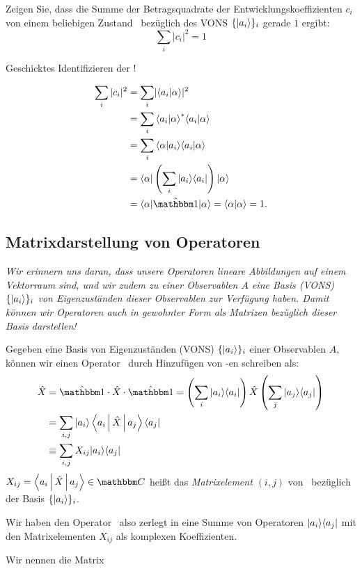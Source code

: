 \begin{aufg}
 Zeigen Sie, dass die Summe der Betragsquadrate der Entwicklungskoeffizienten $c_i$ von einem beliebigen Zustand \keta\ bez\"uglich des VONS $\{\ket{a_i}\}_i$ gerade $1$ ergibt:
 \begin{equation}
  \sum_i |c_i|^2 = 1
 \end{equation}
\end{aufg}
\begin{tipp}
 Geschicktes Identifizieren der \opi!
\end{tipp}
\begin{loes}
 \begin{align}
  \sum_i |c_i|^2 &= \sum_i \lvert\braket{a_i|\alpha}\rvert^2 \\
  &= \sum_i \cc{\braket{a_i | \alpha}} \braket{a_i|\alpha} \\
  &= \sum_i \braket{\alpha | a_i} \braket{a_i|\alpha} \\
  &= \braa \left(\sum_i \ket{a_i}\bra{a_i} \right) \keta \\
  &= \braa \opi \keta = \braket{\alpha | \alpha} = 1.
 \end{align}
 \qedsymbol
\end{loes}


\subsection{Matrixdarstellung von Operatoren}
\emph{Wir erinnern uns daran, dass unsere Operatoren lineare Abbildungen auf einem Vektorraum sind, und wir zudem zu einer Observablen $A$ eine Basis (VONS) $\{\ket{a_i}\}_i$ von Eigenzust\"anden dieser Observablen zur Verf\"ugung haben. Damit k\"onnen wir Operatoren auch in gewohnter Form als Matrizen bez\"uglich dieser Basis darstellen!}
\begin{defn}
 Gegeben eine Basis von Eigenzust\"anden (VONS)  $\{\ket{a_i}\}_i$ einer Observablen $A$, k\"onnen wir einen Operator \opx\ durch Hinzuf\"ugen von \opi-en schreiben als:
 \begin{align}
  \opx &= \opi \cdot  \opx \cdot \opi = \left(\opix{i}{a_i} \right) \opx \left(\opix{j}{a_j}\right) \\
  &= \sum_{i,j} \ket{a_i} \Braket{a_i | \opx | a_j} \bra{a_j} \\
  &\equiv \sum_{i,j} X_{ij} \ket{a_i}\bra{a_j}
 \end{align}
 $X_{ij} = \Braket{a_i | \opx | a_j} \in \comps$ hei\ss{}t das \emph{Matrixelement $(i,j)$} von \opx\ bez\"uglich der Basis $\{\ket{a_i}\}_i$.
\end{defn}
\begin{notiz}
 Wir haben den Operator \opx\ also zerlegt in eine Summe von Operatoren $\ket{a_i}\bra{a_j}$ mit den Matrixelementen $X_{ij}$ als komplexen Koeffizienten.
\end{notiz}
\begin{defn}
 Wir nennen die Matrix
\end{defn}
